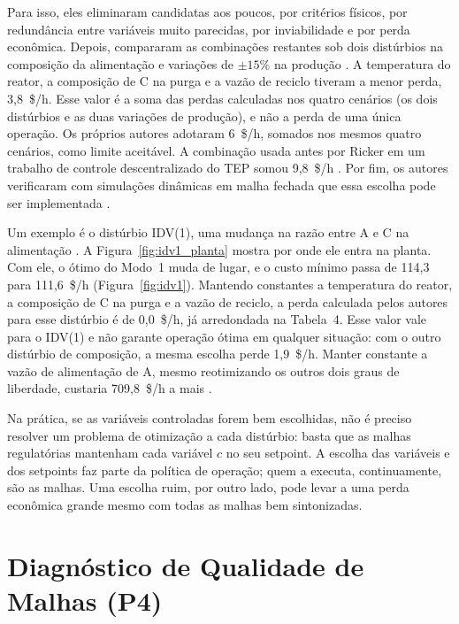 Para isso, eles eliminaram candidatas aos poucos, por critérios físicos, por redundância entre variáveis muito parecidas, por inviabilidade e por perda econômica. Depois, compararam as combinações restantes sob dois distúrbios na composição da alimentação e variações de $\pm 15\%$ na produção \cite[seções~4 e~5]{Larsson2001}. A temperatura do reator, a composição de C na purga e a vazão de reciclo tiveram a menor perda, 3,8~\$/h. Esse valor é a soma das perdas calculadas nos quatro cenários (os dois distúrbios e as duas variações de produção), e não a perda de uma única operação. Os próprios autores adotaram 6~\$/h, somados nos mesmos quatro cenários, como limite aceitável. A combinação usada antes por Ricker em um trabalho de controle descentralizado do TEP somou 9,8~\$/h \cite[Tabela~4]{Larsson2001}. Por fim, os autores verificaram com simulações dinâmicas em malha fechada que essa escolha pode ser implementada \cite[seções~6 e~7]{Larsson2001}.

Um exemplo é o distúrbio IDV(1), uma mudança na razão entre A e C na alimentação \cite{DOWNS1993}. A Figura~\ref{fig:idv1_planta} mostra por onde ele entra na planta. Com ele, o ótimo do Modo~1 muda de lugar, e o custo mínimo passa de 114,3 para 111,6~\$/h (Figura~\ref{fig:idv1}). Mantendo constantes a temperatura do reator, a composição de C na purga e a vazão de reciclo, a perda calculada pelos autores para esse distúrbio é de 0,0~\$/h, já arredondada na Tabela~4. Esse valor vale para o IDV(1) e não garante operação ótima em qualquer situação: com o outro distúrbio de composição, a mesma escolha perde 1,9~\$/h. Manter constante a vazão de alimentação de A, mesmo reotimizando os outros dois graus de liberdade, custaria 709,8~\$/h a mais \cite[seção~3, Tabelas~3 e~4]{Larsson2001}.

Na prática, se as variáveis controladas forem bem escolhidas, não é preciso resolver um problema de otimização a cada distúrbio: basta que as malhas regulatórias mantenham cada variável $c$ no seu setpoint. A escolha das variáveis e dos setpoints faz parte da política de operação; quem a executa, continuamente, são as malhas. Uma escolha ruim, por outro lado, pode levar a uma perda econômica grande mesmo com todas as malhas bem sintonizadas.


\section{Diagnóstico de Qualidade de Malhas (P4)}
\label{sec:diagnostico}

